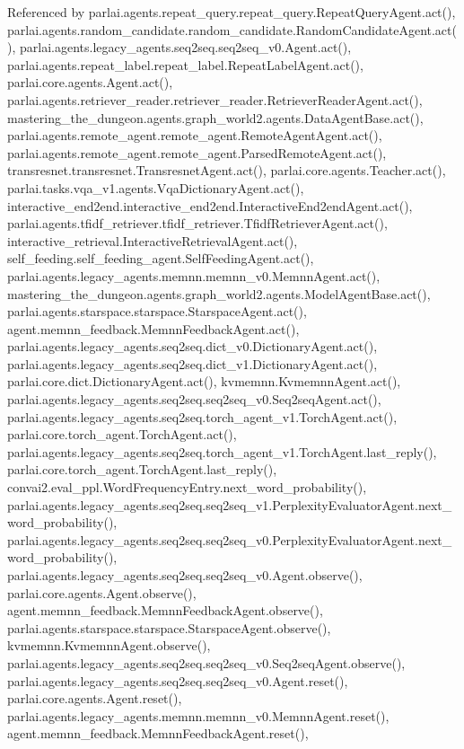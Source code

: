 Referenced by parlai.\+agents.\+repeat\+\_\+query.\+repeat\+\_\+query.\+Repeat\+Query\+Agent.\+act(), parlai.\+agents.\+random\+\_\+candidate.\+random\+\_\+candidate.\+Random\+Candidate\+Agent.\+act(), parlai.\+agents.\+legacy\+\_\+agents.\+seq2seq.\+seq2seq\+\_\+v0.\+Agent.\+act(), parlai.\+agents.\+repeat\+\_\+label.\+repeat\+\_\+label.\+Repeat\+Label\+Agent.\+act(), parlai.\+core.\+agents.\+Agent.\+act(), parlai.\+agents.\+retriever\+\_\+reader.\+retriever\+\_\+reader.\+Retriever\+Reader\+Agent.\+act(), mastering\+\_\+the\+\_\+dungeon.\+agents.\+graph\+\_\+world2.\+agents.\+Data\+Agent\+Base.\+act(), parlai.\+agents.\+remote\+\_\+agent.\+remote\+\_\+agent.\+Remote\+Agent\+Agent.\+act(), parlai.\+agents.\+remote\+\_\+agent.\+remote\+\_\+agent.\+Parsed\+Remote\+Agent.\+act(), transresnet.\+transresnet.\+Transresnet\+Agent.\+act(), parlai.\+core.\+agents.\+Teacher.\+act(), parlai.\+tasks.\+vqa\+\_\+v1.\+agents.\+Vqa\+Dictionary\+Agent.\+act(), interactive\+\_\+end2end.\+interactive\+\_\+end2end.\+Interactive\+End2end\+Agent.\+act(), parlai.\+agents.\+tfidf\+\_\+retriever.\+tfidf\+\_\+retriever.\+Tfidf\+Retriever\+Agent.\+act(), interactive\+\_\+retrieval.\+Interactive\+Retrieval\+Agent.\+act(), self\+\_\+feeding.\+self\+\_\+feeding\+\_\+agent.\+Self\+Feeding\+Agent.\+act(), parlai.\+agents.\+legacy\+\_\+agents.\+memnn.\+memnn\+\_\+v0.\+Memnn\+Agent.\+act(), mastering\+\_\+the\+\_\+dungeon.\+agents.\+graph\+\_\+world2.\+agents.\+Model\+Agent\+Base.\+act(), parlai.\+agents.\+starspace.\+starspace.\+Starspace\+Agent.\+act(), agent.\+memnn\+\_\+feedback.\+Memnn\+Feedback\+Agent.\+act(), parlai.\+agents.\+legacy\+\_\+agents.\+seq2seq.\+dict\+\_\+v0.\+Dictionary\+Agent.\+act(), parlai.\+agents.\+legacy\+\_\+agents.\+seq2seq.\+dict\+\_\+v1.\+Dictionary\+Agent.\+act(), parlai.\+core.\+dict.\+Dictionary\+Agent.\+act(), kvmemnn.\+Kvmemnn\+Agent.\+act(), parlai.\+agents.\+legacy\+\_\+agents.\+seq2seq.\+seq2seq\+\_\+v0.\+Seq2seq\+Agent.\+act(), parlai.\+agents.\+legacy\+\_\+agents.\+seq2seq.\+torch\+\_\+agent\+\_\+v1.\+Torch\+Agent.\+act(), parlai.\+core.\+torch\+\_\+agent.\+Torch\+Agent.\+act(), parlai.\+agents.\+legacy\+\_\+agents.\+seq2seq.\+torch\+\_\+agent\+\_\+v1.\+Torch\+Agent.\+last\+\_\+reply(), parlai.\+core.\+torch\+\_\+agent.\+Torch\+Agent.\+last\+\_\+reply(), convai2.\+eval\+\_\+ppl.\+Word\+Frequency\+Entry.\+next\+\_\+word\+\_\+probability(), parlai.\+agents.\+legacy\+\_\+agents.\+seq2seq.\+seq2seq\+\_\+v1.\+Perplexity\+Evaluator\+Agent.\+next\+\_\+word\+\_\+probability(), parlai.\+agents.\+legacy\+\_\+agents.\+seq2seq.\+seq2seq\+\_\+v0.\+Perplexity\+Evaluator\+Agent.\+next\+\_\+word\+\_\+probability(), parlai.\+agents.\+legacy\+\_\+agents.\+seq2seq.\+seq2seq\+\_\+v0.\+Agent.\+observe(), parlai.\+core.\+agents.\+Agent.\+observe(), agent.\+memnn\+\_\+feedback.\+Memnn\+Feedback\+Agent.\+observe(), parlai.\+agents.\+starspace.\+starspace.\+Starspace\+Agent.\+observe(), kvmemnn.\+Kvmemnn\+Agent.\+observe(), parlai.\+agents.\+legacy\+\_\+agents.\+seq2seq.\+seq2seq\+\_\+v0.\+Seq2seq\+Agent.\+observe(), parlai.\+agents.\+legacy\+\_\+agents.\+seq2seq.\+seq2seq\+\_\+v0.\+Agent.\+reset(), parlai.\+core.\+agents.\+Agent.\+reset(), parlai.\+agents.\+legacy\+\_\+agents.\+memnn.\+memnn\+\_\+v0.\+Memnn\+Agent.\+reset(), agent.\+memnn\+\_\+feedback.\+Memnn\+Feedback\+Agent.\+reset(), 